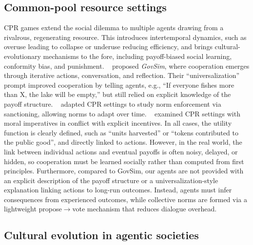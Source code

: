 \documentclass[sigconf]{aamas}
\begin{document}
\subsection{Common-pool resource settings}

CPR games extend the social dilemma to multiple agents drawing from a rivalrous, regenerating resource. 
This introduces intertemporal dynamics, such as overuse leading to collapse or underuse reducing efficiency, and brings cultural-evolutionary mechanisms to the fore, including payoff-biased social learning, conformity bias, and punishment. 
~\citet{piatti2024govsim} proposed \textit{GovSim}, where cooperation emerges through iterative actions, conversation, and reflection. 
Their ``universalization'' prompt improved cooperation by telling agents, e.g., ``If everyone fishes more than X, the lake will be empty,'' but still relied on explicit knowledge of the payoff structure.
~\citet{piedrahita2025corrupted} adapted CPR settings to study norm enforcement via sanctioning, allowing norms to adapt over time.
~\citet{backmann2025ethics} examined CPR settings with moral imperatives in conflict with explicit incentives. 
In all cases, the utility function is clearly defined, such as ``units harvested'' or ``tokens contributed to the public good'', and directly linked to actions.
However, in the real world, the link between individual actions and eventual payoffs is often noisy, delayed, or hidden, so cooperation must be learned socially rather than computed from first principles.
Furthermore, compared to GovSim, our agents are not provided with an explicit description of the payoff structure or a universalization-style explanation linking actions to long-run outcomes.
Instead, agents must infer consequences from experienced outcomes, while collective norms are formed via a lightweight propose$\to$vote mechanism that reduces dialogue overhead.

\subsection{Cultural evolution in agentic societies}
\end{document}
